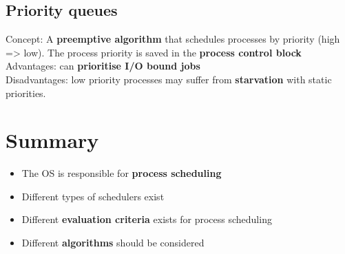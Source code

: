 \documentclass{article}
\begin{document}
\begin{center}
\end{center}

\subsection{Priority queues}
\begin{flushleft}
Concept: A \textbf{preemptive algorithm} that schedules processes by priority (high => low). The process priority is saved in the \textbf{process control block}\\
Advantages: can \textbf{prioritise I/O bound jobs}\\
Disadvantages: low priority processes may suffer from \textbf{starvation} with static priorities.
\end{flushleft}
\begin{center}
\end{center}

\section{Summary}
\begin{itemize}
	\item The OS is responsible for \textbf{process scheduling}
	\item Different types of schedulers exist
	\item Different \textbf{evaluation criteria} exists for process scheduling
	\item Different \textbf{algorithms} should be considered
\end{itemize}
\end{document}
